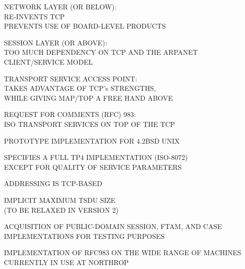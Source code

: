 \begin{bwslide}

\begin{nrtc}
\item	NETWORK LAYER (OR BELOW):\\
	RE-INVENTS TCP\\ PREVENTS USE OF BOARD-LEVEL PRODUCTS
\item	SESSION LAYER (OR ABOVE):\\
	TOO MUCH DEPENDENCY ON TCP AND THE ARPANET CLIENT/SERVICE MODEL
\item	TRANSPORT SERVICE ACCESS POINT:\\
	TAKES ADVANTAGE OF TCP's STRENGTHS,\\
	WHILE GIVING MAP/TOP A FREE HAND ABOVE
\end{nrtc}
\end{bwslide}


\begin{bwslide}

\begin{nrtc}
\item	REQUEST FOR COMMENTS (RFC) 983:\\
	ISO TRANSPORT SERVICES ON TOP OF THE TCP
\item	PROTOTYPE IMPLEMENTATION FOR 4.2BSD UNIX
\end{nrtc}
\end{bwslide}


\begin{bwslide}

\begin{nrtc}
\item	SPECIFIES A FULL TP4 IMPLEMENTATION (ISO-8072)\\
	EXCEPT FOR QUALITY OF SERVICE PARAMETERS
\item	ADDRESSING IS TCP-BASED
\item	IMPLICIT MAXIMUM TSDU SIZE\\
	(TO BE RELAXED IN VERSION 2)
\end{nrtc}
\end{bwslide}


\begin{bwslide}

\begin{nrtc}
\item	ACQUISITION OF PUBLIC-DOMAIN SESSION, FTAM, AND CASE IMPLEMENTATIONS
	FOR TESTING PURPOSES
\item	IMPLEMENTATION OF RFC983 ON THE WIDE RANGE OF MACHINES CURRENTLY
	IN USE AT NORTHROP
\end{nrtc}
\end{bwslide}


